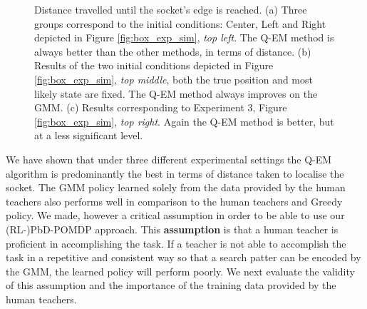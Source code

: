 \begin{figure}
 \centering
   \hfill
   \hfill
   \caption{Distance travelled until the socket's edge is reached. (a) Three groups correspond to the initial conditions: Center, Left and Right
   depicted in Figure \ref{fig:box_exp_sim}, \textit{top left}. The Q-EM method is always better than the other methods, in terms of distance. (b)
   Results of the two initial conditions depicted in Figure \ref{fig:box_exp_sim}, \textit{top middle}, both the true position and most likely state are
   fixed. The Q-EM method always improves on the GMM. (c) Results corresponding to Experiment 3, Figure \ref{fig:box_exp_sim}, \textit{top right}.
   Again the Q-EM method is better, but at a less significant level.}
   \label{fig:three_searches}
\end{figure}


We have shown that under three different experimental settings the Q-EM algorithm is predominantly the best in terms of distance taken 
to localise the socket. The GMM policy learned solely from the data provided by the human teachers also performs well in comparison to  
the human teachers and Greedy policy. We made, however a critical assumption in order to be able to use our (RL-)PbD-POMDP approach. 
This \textbf{assumption} is that a human teacher is proficient in accomplishing the task. If a teacher is not able to accomplish 
the task in a repetitive and consistent way so that a search patter can be encoded by the GMM, the learned policy will perform poorly.
We next evaluate the validity of this assumption and the importance of the training data provided by the human teachers.
% 

